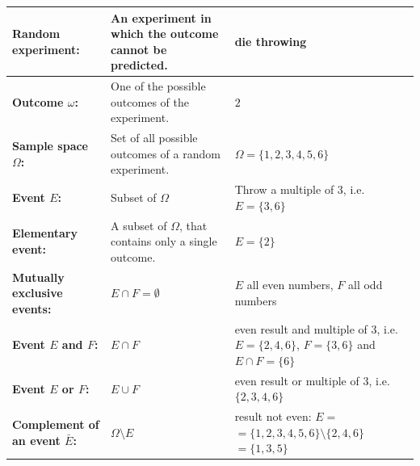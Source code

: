 \documentclass[twoside,11pt,a4paper]{article}
\newif\ifEN \ENtrue	                %
\def\tr|#1|#2|{\ifEN #2\else #1\fi}     %
\theoremstyle{definition}
\newcounter{exc}
\begin{document}
\renewcommand{\arraystretch}{2}
{\footnotesize
\begin{tabular}{p{4.2cm}|p{4cm}|p{4.5cm}}
\hline
\hline
\textbf{\tr|Zufallsexperiment|Random experiment|:} &
\tr|Ein Experiment, dessen Ausgang nicht vorhergesagt werden kann. |An experiment in which the outcome cannot be predicted.|& 
\tr|Würfel werfen|die throwing|\\
\hline
\hline
\textbf{\tr|Ergebnis|Outcome|  $\omega$:} & \tr|Ein möglicher Ausgang des Experiments.| One of the possible outcomes of the experiment.|& $2$\\
\hline
\textbf{\tr|Ergebnismenge|Sample space| $\Omega$:} &
\tr|Menge aller möglichen Ergebnisse einers Zufallsexperiments.|Set of all possible outcomes of a random experiment.|  & 
$\Omega=\{1,2,3,4,5,6\}$\\
\hline
\hline
\textbf{\tr|Ereignis|Event|  $E$:} & \tr|Teilmenge von |Subset of | $\Omega$ & \parbox[t]{4.5cm}{\tr|Ein Vielfaches von 3 werfen,\\ d.h. |Throw a multiple of 3, \\ i.e. | $E=\{3,6\}$} \\
\hline
\textbf{\tr|Elementarerignis|Elementary event|:} & \tr|Eine Teilmenge von $\Omega$, die nur ein Element enthält.|A subset of $\Omega$, that contains only a single outcome.| & $E=\{2\}$\\
\hline
\hline
\textbf{\tr|Sich ausschliessende Ereignisse|Mutually exclusive events|:} & $E\cap F = \emptyset$ &
\parbox[t]{4.5cm}{ $E$ \tr|alle geraden Zahlen|all even numbers|, \\ $F$ \tr|alle ungeraden Zahlen|all odd numbers|\\ }\\
\hline
\textbf{\tr|Ereignis |Event | $E$ \tr|und |and | $F$:} & $E\cap F$ & \parbox[t]{4.5cm}{ \tr|gerades Resultat und \\Vielfaches von 3 d.h. |even result and \\multiple of 3, i.e. |
\\ $E=\{2,4,6\}$, $F=\{3,6\}$ \\ \tr|und |and | $E\cap F=\{6\}$ \\ }\\
\hline
\textbf{\tr|Ereignis |Event |$E$ \tr|oder |or | $F$:} & $E \cup F$ &\parbox[t]{4.5cm}{ \tr|gerades Resultat oder \\Vielfaches von 3 d.h. |even result or  \\multiple of 3, i.e. |
 \\$\{2,3,4,6\}$\\ }\\
\hline
\textbf{\tr|Gegenereignis |Complement of an event |$\bar{E}$:} & $\Omega \setminus E$ & \parbox[t]{4.5cm}{\tr|Resultat nicht gerade:|result not even:|
\\ $E=$\\$=\{1,2,3,4,5,6\} \setminus \{2,4,6\}$\\$=\{1,3,5\}$ \\ }\\
\hline
\hline
\end{tabular}
}
\vspace{1cm}
\end{document}
